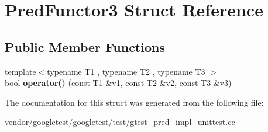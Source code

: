 \hypertarget{struct_pred_functor3}{}\section{Pred\+Functor3 Struct Reference}
\label{struct_pred_functor3}
\subsection*{Public Member Functions}
\begin{DoxyCompactItemize}
\item 
\mbox{\label{struct_pred_functor3_a08b0c59189570fb8eb7e2c7452fec995}} 
{\footnotesize template$<$typename T1 , typename T2 , typename T3 $>$ }\\bool {\bfseries operator()} (const T1 \&v1, const T2 \&v2, const T3 \&v3)
\end{DoxyCompactItemize}


The documentation for this struct was generated from the following file\+:\begin{DoxyCompactItemize}
\item 
vendor/googletest/googletest/test/gtest\+\_\+pred\+\_\+impl\+\_\+unittest.\+cc\end{DoxyCompactItemize}
